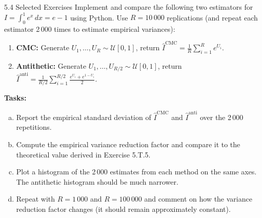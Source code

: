 \documentclass[aspectratio=169,10pt]{beamer}
\begin{document}
\begin{frame}[allowframebreaks]{5.4 Selected Exercises}
Implement and compare the following two estimators for $I = \int_0^1 e^x\,dx = e - 1$
using Python.  Use $R = 10\,000$ replications (and repeat each estimator 2\,000
times to estimate empirical variances):

\begin{enumerate}
  \item \textbf{CMC:} Generate $U_1, \ldots, U_R \sim \mathcal{U}[0,1]$, return
        $\hat{I}^{\mathrm{CMC}} = \frac{1}{R}\sum_{i=1}^R e^{U_i}$.
  \item \textbf{Antithetic:} Generate $U_1, \ldots, U_{R/2} \sim \mathcal{U}[0,1]$,
        return $\hat{I}^{\mathrm{anti}} = \frac{1}{R/2}\sum_{i=1}^{R/2}\frac{e^{U_i} + e^{1-U_i}}{2}$.
\end{enumerate}

\textbf{Tasks:}
\begin{enumerate}[(a)]
  \item Report the empirical standard deviation of $\hat{I}^{\mathrm{CMC}}$ and
        $\hat{I}^{\mathrm{anti}}$ over the 2\,000 repetitions.
  \item Compute the empirical variance reduction factor and compare it to the
        theoretical value derived in Exercise 5.T.5.
  \item Plot a histogram of the 2\,000 estimates from each method on the same
        axes.  The antithetic histogram should be much narrower.
  \item Repeat with $R = 1\,000$ and $R = 100\,000$ and comment on how the
        variance reduction factor changes (it should remain approximately constant).
\end{enumerate}

\end{frame}

\end{document}
